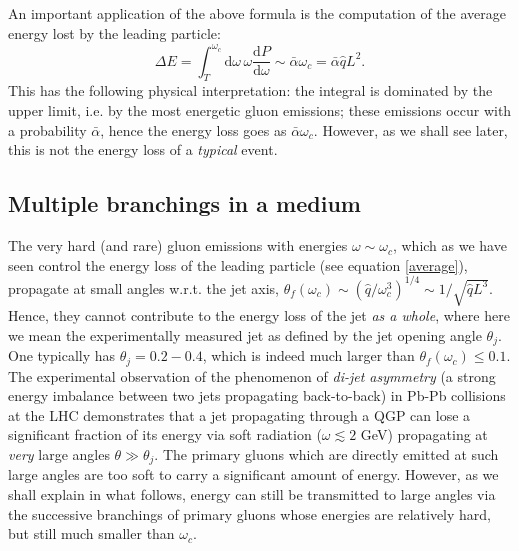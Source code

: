 \documentclass[a4paper,12pt]{article}
\numberwithin{equation}{section}
\begin{document}
An important application of the above formula is the computation of the average energy lost by the leading particle:
\begin{equation}\label{average}
\Delta E = \int_T^{\omega_c} \mathrm{d}\omega \, \omega \frac{\mathrm{d}P}{\mathrm{d}\omega} \sim \bar{\alpha} \omega_c=\bar{\alpha}\hat{q}L^2.
\end{equation}
This has the following physical interpretation: the integral is dominated by the upper limit, i.e. by the most energetic gluon emissions; these emissions occur with a probability $\bar{\alpha}$, hence the energy loss goes as $\bar{\alpha}\omega_c$. However, as we shall see later, this is not the energy loss of a \emph{typical} event.



\subsection{Multiple branchings in a medium}\label{multiplebranchings}

The very hard (and rare) gluon emissions with energies $\omega \sim \omega_c$, which as we have seen control the energy loss of the leading particle (see equation \eqref{average}), propagate at small angles w.r.t. the jet axis, $\theta_f(\omega_c) \sim (\hat{q}/\omega_c^3)^{1/4} \sim 1/\sqrt{\hat{q}L^3}$. Hence, they cannot contribute to the energy loss of the jet \emph{as a whole}, where here we mean the experimentally measured jet as defined by the jet opening angle $\theta_j$. One typically has $\theta_j=0.2-0.4$, which is indeed much larger than $\theta_f(\omega_c) \leq 0.1$. The experimental observation of the phenomenon of \emph{di-jet asymmetry} (a strong energy imbalance between two jets propagating back-to-back) in Pb-Pb collisions at the LHC\cite{Aad:2010bu,Chatrchyan:2011sx} demonstrates that a jet propagating through a QGP can lose a significant fraction of its energy via soft radiation ($\omega \lesssim 2$ GeV) propagating at \emph{very} large angles $\theta \gg \theta_j$. The primary gluons which are directly emitted at such large angles are too soft to carry a significant amount of energy. However, as we shall explain in what follows, energy can still be transmitted to large angles via the successive branchings of primary gluons whose energies are relatively hard, but still much smaller than $\omega_c$.
\end{document}
